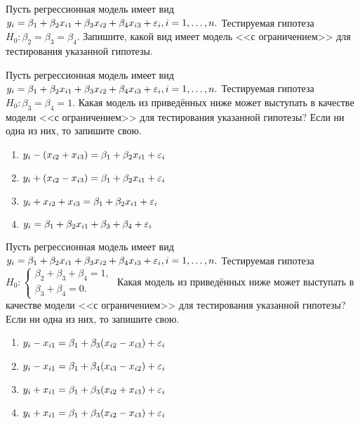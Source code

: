 \documentclass[pdftex,11pt,openany]{book}\usepackage[]{graphicx}\usepackage[]{color}
\begin{document}
\begin{solution}
\end{solution}


\begin{problem}
 Пусть регрессионная модель имеет вид $y_i=\beta_1+\beta_2 x_{i1}+\beta_3 x_{i2}+\beta_4 x_{i3}+\varepsilon_i, i=1,\dots,n.$ Тестируемая гипотеза $H_0: \beta_2=\beta_3=\beta_4.$ Запишите, какой вид имеет модель <<с ограничением>> для тестирования указанной гипотезы.
\end{problem}

\begin{solution}
\end{solution}


\begin{problem}
 Пусть регрессионная модель имеет вид $y_i= \beta_1+ \beta_2 x_{i1}+ \beta_3 x_{i2}+ \beta_4 x_{i3}+\varepsilon_i, i=1,\dots,n.$ Тестируемая гипотеза $H_0: \beta_3= \beta_4=1.$ Какая модель из приведённых ниже может выступать в качестве модели <<с ограничением>> для тестирования указанной гипотезы? Если ни одна из них, то запишите свою.
\begin{enumerate}
\item $y_i-(x_{i2}+x_{i3}) = \beta_1+ \beta_2 x_{i1}+ \varepsilon_i$
\item $y_i+(x_{i2}-x_{i3}) = \beta_1+ \beta_2 x_{i1}+ \varepsilon_i$
\item $y_i+x_{i2}+x_{i3} = \beta_1+ \beta_2 x_{i1}+ \varepsilon_i$
\item $y_i= \beta_1+ \beta_2 x_{i1}+ \beta_3 + \beta_4 + \varepsilon_i$
\end{enumerate}
\end{problem}

\begin{solution}
\end{solution}


\begin{problem}
 Пусть регрессионная модель имеет вид $y_i= \beta_1+ \beta_2 x_{i1}+ \beta_3 x_{i2}+ \beta_4 x_{i3}+\varepsilon_i, i=1,\dots,n.$ Тестируемая гипотеза 
$H_0: 
  \begin{cases}
    \beta_2+ \beta_3+ \beta_4=1, \\
    \beta_3+ \beta_4=0. 
 \end{cases}$
Какая модель из приведённых ниже может выступать в качестве модели <<с ограничением>> для тестирования указанной гипотезы? Если ни одна из них, то запишите свою.
\begin{enumerate}
\item $y_i-x_{i1} = \beta_1+ \beta_3 (x_{i2}-x_{i3})+ \varepsilon_i$
\item $y_i-x_{i1} = \beta_1+ \beta_4 (x_{i3}-x_{i2})+ \varepsilon_i$
\item $y_i+x_{i1} = \beta_1+ \beta_3 (x_{i2}+x_{i3})+ \varepsilon_i$
\item $y_i+x_{i1} = \beta_1+ \beta_3 (x_{i2}-x_{i3})+ \varepsilon_i$
\end{enumerate}
\end{problem}
\end{document}
